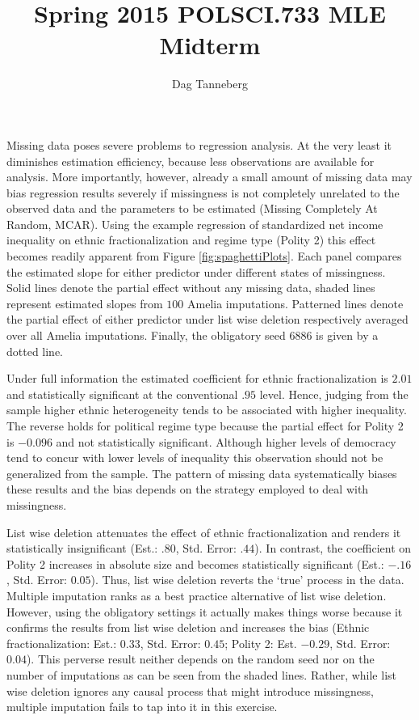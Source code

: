 \documentclass{scrartcl}\usepackage[]{graphicx}\usepackage[]{color}
\title{Spring 2015 POLSCI.733 MLE Midterm}
\author{Dag Tanneberg}
\date{}
\begin{document}
\maketitle

Missing data poses severe problems to regression analysis. 
At the very least it diminishes estimation efficiency, 
because less observations are available for analysis. More 
importantly, however, already a small amount of missing data 
may bias regression results severely if missingness is not 
completely unrelated to the observed data and the parameters to 
be estimated (Missing Completely At Random, MCAR). Using the 
example regression of standardized net income inequality on 
ethnic fractionalization and regime type (Polity 2) this effect
becomes readily apparent from Figure \ref{fig:spaghettiPlots}. 
Each panel compares the estimated slope for either predictor 
under different states of missingness. Solid lines 
denote the partial effect without any missing data, 
shaded lines represent estimated slopes from $100$ Amelia 
imputations. Patterned lines denote the partial effect of either 
predictor under list wise deletion respectively averaged over all
Amelia imputations. Finally, the obligatory seed $6886$ is 
given by a dotted line.

Under full information the estimated coefficient for ethnic 
fractionalization is $2.01$ and statistically significant at the
conventional $.95$ level. Hence, judging from the sample higher 
ethnic heterogeneity tends to be associated with higher inequality. 
The reverse holds for political regime type because the partial 
effect for Polity 2 is $-0.096$ and not statistically 
significant. Although higher levels of democracy tend to concur 
with lower levels of inequality this observation should not be 
generalized from the sample. The pattern of missing data 
systematically biases these results and the bias depends on the 
strategy employed to deal with missingness. 

List wise deletion attenuates the effect of ethnic 
fractionalization and renders it statistically insignificant 
(Est.: $.80$, Std. Error: $.44$). In contrast, the coefficient on
Polity 2 increases in absolute size and becomes statistically 
significant (Est.: $-.16$, Std. Error: $0.05$). Thus, list wise 
deletion reverts the `true' process in the data. Multiple 
imputation ranks as a best practice alternative of list wise 
deletion. However, using the obligatory settings it
actually makes things worse because it confirms the results from 
list wise deletion and increases the bias 
(Ethnic fractionalization: Est.: $0.33$, Std. Error:
$0.45$; Polity 2: Est. $-0.29$, Std. Error: $0.04$). This 
perverse result neither depends on the random seed nor on the 
number of imputations as can be seen from the shaded lines. 
Rather, while list wise deletion ignores any causal process that 
might introduce missingness, multiple imputation fails to tap into
it in this exercise.
\end{document}
